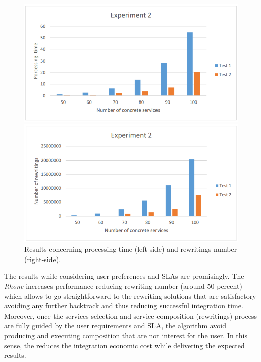

\begin{figure}%
\centering
\parbox{2.2in}{\includegraphics[scale=0.30]{exp2.png}}%
\qquad
\begin{minipage}{2in}%
\includegraphics[scale=0.30]{exp3.png}
\end{minipage}%
\caption{Results concerning processing time (left-side) and rewritings number (right-side).}%
\label{fig:fig02}%
\end{figure}

The results while considering user preferences and SLAs are promisingly.  
The \textit{Rhone} increases performance reducing rewriting number (around 50 percent) which allows to go straightforward to the rewriting solutions that are satisfactory avoiding any further backtrack and thus reducing successful integration time. Moreover, once the services selection and service composition (rewritings) process are fully guided by the user requirements and SLA, the algorithm avoid producing and executing composition that are not interest for the user. In this sense, the reduces the integration economic cost while delivering the expected results.
